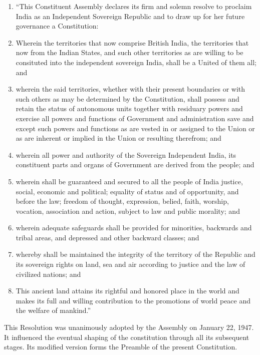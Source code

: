 \begin{enumerate}
  \item \textquotedblleft This Constituent Assembly declares its firm and solemn resolve to proclaim India as an Independent Sovereign Republic and to draw up for her future governance a Constitution:
  \item Wherein the territories that now comprise British India, the territories that now from the Indian States, and such other territories as are willing to be consituted into the independent sovereign India, shall be a United of them all; and
  \item wherein the said territories, whether with their present boundaries or with such others as may be determined by the Constitution, shall possess and retain the status of autonomous units together with residuary powers and exercise all powers and functions of Government and administration save and except such powers and functions as are vested in or assigned to the Union or as are inherent or implied in the Union or resulting therefrom; and
  \item wherein all power and authority of the Sovereign Independent India, its constituent parts and organs of Government are derived from the people; and
  \item wherein shall be guaranteed and secured to all the people of India justice, social, economic and political; equality of status and of opportunity, and before the law; freedom of thought, expression, belied, faith, worship, vocation, association and action, subject to law and public morality; and
  \item wherein adequate safeguards shall be provided for minorities, backwards and tribal areas, and depressed and other backward classes; and
  \item whereby shall be maintained the integrity of the territory of the Republic and its sovereign rights on land, sea and air according to justice and the law of civilized nations; and
  \item This ancient land attains its rightful and honored place in the world and makes its full and willing contribution to the promotions of world peace and the welfare of mankind.\textquotedblright
  
\end{enumerate}

This Resolution was unanimously adopted by the Assembly on January 22, 1947. It influenced the eventual shaping of the constitution through all its subsequent stages. Its modified version forms the Preamble of the present Constitution.

